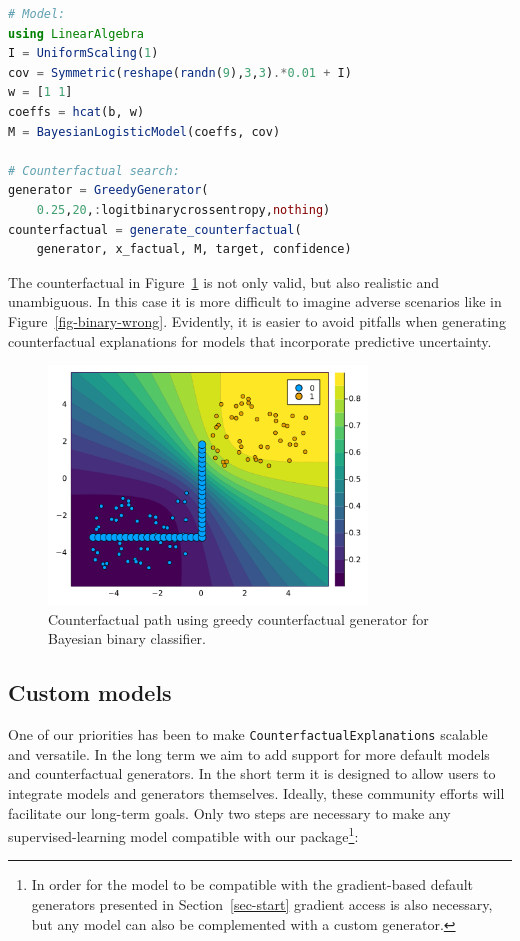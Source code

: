 \documentclass[
  letterpaper,
  DIV=11,
  numbers=noendperiod]{scrartcl}
\begin{document}
\begin{lstlisting}[language = Julia]
# Model:
using LinearAlgebra
I = UniformScaling(1)
cov = Symmetric(reshape(randn(9),3,3).*0.01 + I) 
w = [1 1]
coeffs = hcat(b, w)
M = BayesianLogisticModel(coeffs, cov)

# Counterfactual search:
generator = GreedyGenerator(
    0.25,20,:logitbinarycrossentropy,nothing)
counterfactual = generate_counterfactual(
    generator, x_factual, M, target, confidence)
\end{lstlisting}

The counterfactual in Figure~\ref{fig-binary-laplace} is not only valid,
but also realistic and unambiguous. In this case it is more difficult to
imagine adverse scenarios like in Figure~\ref{fig-binary-wrong}.
Evidently, it is easier to avoid pitfalls when generating counterfactual
explanations for models that incorporate predictive uncertainty.

\begin{figure}

{\centering \includegraphics[width=3.33333in,height=2.5in]{www/ce_binary_laplace.png}

}

\caption{\label{fig-binary-laplace}Counterfactual path using greedy
counterfactual generator for Bayesian binary classifier.}

\end{figure}

\hypertarget{sec-custom}{%
\subsection{Custom models}\label{sec-custom}}

One of our priorities has been to make
\texttt{CounterfactualExplanations} scalable and versatile. In the long
term we aim to add support for more default models and counterfactual
generators. In the short term it is designed to allow users to integrate
models and generators themselves. Ideally, these community efforts will
facilitate our long-term goals. Only two steps are necessary to make any
supervised-learning model compatible with our package\footnote{In order
  for the model to be compatible with the gradient-based default
  generators presented in Section~\ref{sec-start} gradient access is
  also necessary, but any model can also be complemented with a custom
  generator.}:
\end{document}
